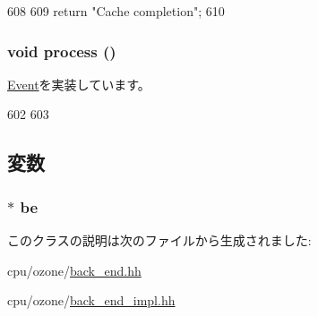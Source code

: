 \begin{DoxyCode}
608 {
609     return "Cache completion";
610 }
\end{DoxyCode}
\hypertarget{classBackEnd_1_1DCacheCompletionEvent_a2e9c5136d19b1a95fc427e0852deab5c}{
\subsubsection[{process}]{\setlength{\rightskip}{0pt plus 5cm}void process ()}}
\label{classBackEnd_1_1DCacheCompletionEvent_a2e9c5136d19b1a95fc427e0852deab5c}


\hyperlink{classEvent_a142b75b68a6291400e20fb0dd905b1c8}{Event}を実装しています。


\begin{DoxyCode}
602 {
603 }
\end{DoxyCode}


\subsection{変数}
\hypertarget{classBackEnd_1_1DCacheCompletionEvent_a84f815aa1fa864ba2e6d75f5ad2b52d1}{
\subsubsection[{be}]{$\ast$ {\bf be}}}
\label{classBackEnd_1_1DCacheCompletionEvent_a84f815aa1fa864ba2e6d75f5ad2b52d1}


このクラスの説明は次のファイルから生成されました:\begin{DoxyCompactItemize}
\item 
cpu/ozone/\hyperlink{back__end_8hh}{back\_\-end.hh}\item 
cpu/ozone/\hyperlink{back__end__impl_8hh}{back\_\-end\_\-impl.hh}\end{DoxyCompactItemize}
